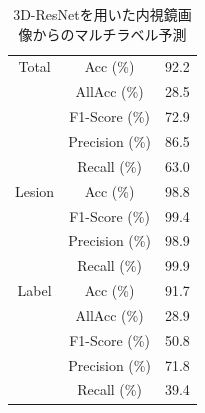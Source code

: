 \begin{table}[tb]
    \caption[]{3D-ResNetを用いた内視鏡画像からのマルチラベル予測}
    \label{tb:resnet3d}
    \centering
    \normalsize
    \begin{tabular}{c|c|r} \hline
        Total & Acc (\%) & 92.2 \\ \cline{2-3}
         & AllAcc (\%) & 28.5 \\ \cline{2-3}
         & F1-Score (\%) & 72.9 \\ \cline{2-3}
         & Precision (\%) & 86.5 \\ \cline{2-3}
         & Recall (\%) & 63.0 \\ \hline
        Lesion & Acc (\%) & 98.8 \\ \cline{2-3}
         & F1-Score (\%) & 99.4 \\ \cline{2-3}
         & Precision (\%) & 98.9 \\ \cline{2-3}
         & Recall (\%) & 99.9 \\ \hline
        Label & Acc (\%) & 91.7 \\ \cline{2-3}
         & AllAcc (\%) & 28.9 \\ \cline{2-3}
         & F1-Score (\%) & 50.8 \\ \cline{2-3}
         & Precision (\%) & 71.8 \\ \cline{2-3}
         & Recall (\%) & 39.4 \\ \hline
    \end{tabular}
\end{table}
